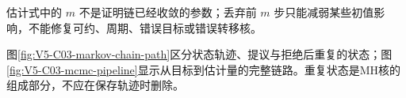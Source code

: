 \documentclass[UTF8,a4paper,11pt,openany]{ctexbook}
\begin{document}
\setcounter{page}{759}
\setcounter{chapter}{32}
\setcounter{figure}{1}
\pagestyle{headings}
估计式中的 $m$ 不是证明链已经收敛的参数；丢弃前 $m$ 步只能减弱某些初值影响，不能修复可约、周期、错误目标或错误转移核。

图\ref{fig:V5-C03-markov-chain-path}区分状态轨迹、提议与拒绝后重复的状态；图\ref{fig:V5-C03-mcmc-pipeline}显示从目标到估计量的完整链路。重复状态是MH核的组成部分，不应在保存轨迹时删除。


\end{document}
